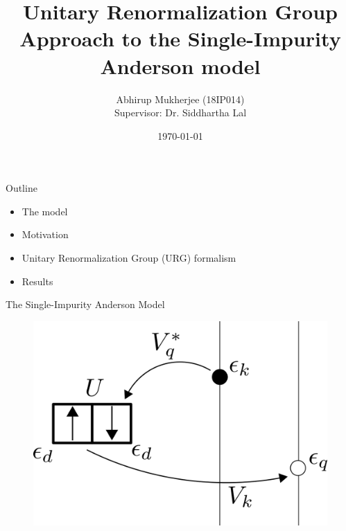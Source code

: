 \documentclass[aspectratio=169]{beamer}
\title{Unitary Renormalization Group Approach to the Single-Impurity Anderson model}
\subtitle{}
\date{\today}
\author{Abhirup Mukherjee (18IP014)\\[5mm]{Supervisor: Dr. Siddhartha Lal}}
\institute{IISER Kolkata}
\begin{document}
\begin{frame}
\maketitle
\end{frame}

\begin{frame}{Outline}

\begin{itemize}
  \item The model
	  \vspace*{20pt}
  \item Motivation
	  \vspace*{20pt}
  \item Unitary Renormalization Group (URG) formalism
	  \vspace*{20pt}
  \item Results 
\end{itemize}

\end{frame}

\begin{frame}{The Single-Impurity Anderson Model}

%
\begin{figure}
\centering
\includegraphics[scale=0.55]{model_scheme.png}
\end{figure}

\end{frame}
\end{document}
